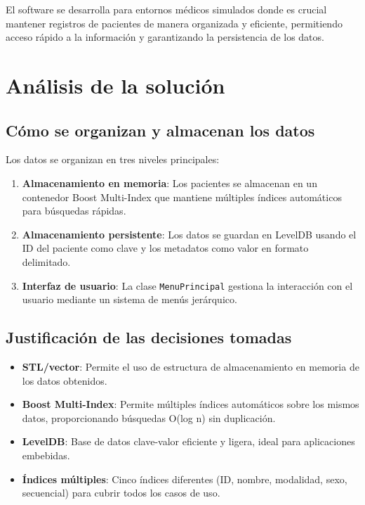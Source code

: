 \documentclass[12pt]{article}
\begin{document}
	El software se desarrolla para entornos médicos simulados donde es crucial mantener registros de pacientes de manera organizada y eficiente, permitiendo acceso rápido a la información y garantizando la persistencia de los datos.
	
	\section{Análisis de la solución}
	
	\subsection*{Cómo se organizan y almacenan los datos}
	Los datos se organizan en tres niveles principales:
	
	\begin{enumerate}
		\item \textbf{Almacenamiento en memoria}: Los pacientes se almacenan en un contenedor Boost Multi-Index que mantiene múltiples índices automáticos para búsquedas rápidas.
		\item \textbf{Almacenamiento persistente}: Los datos se guardan en LevelDB usando el ID del paciente como clave y los metadatos como valor en formato delimitado.
		\item \textbf{Interfaz de usuario}: La clase \texttt{MenuPrincipal} gestiona la interacción con el usuario mediante un sistema de menús jerárquico.
	\end{enumerate}
	
	\subsection*{Justificación de las decisiones tomadas}
	\begin{itemize}
		\item \textbf{STL/vector}: Permite el uso de estructura de almacenamiento en memoria de los datos obtenidos.
		\item \textbf{Boost Multi-Index}: Permite múltiples índices automáticos sobre los mismos datos, proporcionando búsquedas O(log n) sin duplicación.
		\item \textbf{LevelDB}: Base de datos clave-valor eficiente y ligera, ideal para aplicaciones embebidas.
		\item \textbf{Índices múltiples}: Cinco índices diferentes (ID, nombre, modalidad, sexo, secuencial) para cubrir todos los casos de uso.
	\end{itemize}
	
\end{document}

